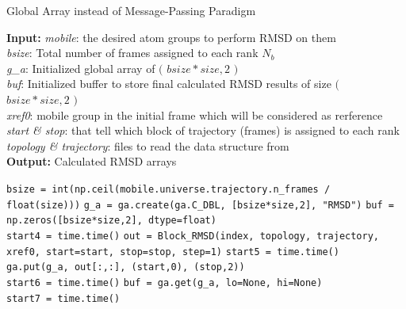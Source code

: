 \begin{algorithm}[t]
	\scriptsize
    \caption{Global Array instead of Message-Passing Paradigm}
    \label{alg:GA}
    \hspace*{\algorithmicindent} \textbf{Input:} \emph{mobile}: the desired atom groups to perform RMSD on them \\ 
    \hspace*{\algorithmicindent} \emph{bsize}: Total number of frames assigned to each rank $N_{b}$\\
    \hspace*{\algorithmicindent} \emph{g\_a}: Initialized global array of $($ $bsize*size,2$ $)$  \\
    \hspace*{\algorithmicindent} \emph{buf}: Initialized buffer to store final calculated RMSD results of size $($ $bsize*size,2$ $)$  \\
    \hspace*{\algorithmicindent} \emph{xref0}: mobile group in the initial frame which will be considered as rerference \\
    \hspace*{\algorithmicindent} \emph{start \& stop}: that tell which block of trajectory (frames) is assigned to each rank \\
    \hspace*{\algorithmicindent} \emph{topology \& trajectory}: files to read the data structure from \\
    \hspace*{\algorithmicindent} \textbf{Output:} Calculated RMSD arrays
    \begin{algorithmic}[1]
        \State \texttt{bsize = int(np.ceil(mobile.universe.trajectory.n\_frames / float(size)))}
        \State \texttt{g\_a = ga.create(ga.C\_DBL, [bsize*size,2], "RMSD")}
        \State \texttt{buf = np.zeros([bsize*size,2], dtype=float)}
        \\
        \State \texttt{start4 = time.time()}
	\State \texttt{out = Block\_RMSD(index, topology, trajectory, xref0, start=start, stop=stop, step=1)}
	\State \texttt{start5 = time.time()}
	\\
	\State \texttt{ga.put(g\_a, out[:,:], (start,0), (stop,2))}
	\\
	\State \texttt{start6 = time.time()}
   	     \State \texttt{buf = ga.get(g\_a, lo=None, hi=None)}
        \EndIf
         \\
         \State \texttt{start7 = time.time()}        
    \end{algorithmic}
\end{algorithm}

